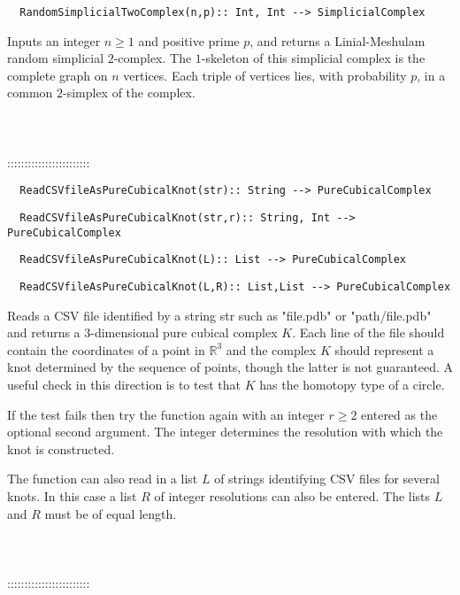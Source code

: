 \documentclass[a4paper,11pt]{report}
\begin{document}
{\begin{verbatim}  RandomSimplicialTwoComplex(n,p):: Int, Int --> SimplicialComplex
\end{verbatim}


 

 Inputs an integer $ n \ge 1 $ and positive prime $p$, and returns a Linial-Meshulam random simplicial $2$-complex. The $1$-skeleton of this simplicial complex is the complete graph on $n$ vertices. Each triple of vertices lies, with probability $p$, in a common $2$-simplex of the complex. \\
 \\
 \\
 \\
 ::::::::::::::::::::::::\\
 
\begin{verbatim}  ReadCSVfileAsPureCubicalKnot(str):: String --> PureCubicalComplex
\end{verbatim}
 
\begin{verbatim}  ReadCSVfileAsPureCubicalKnot(str,r):: String, Int --> PureCubicalComplex
\end{verbatim}
 
\begin{verbatim}  ReadCSVfileAsPureCubicalKnot(L):: List --> PureCubicalComplex
\end{verbatim}
 
\begin{verbatim}  ReadCSVfileAsPureCubicalKnot(L,R):: List,List --> PureCubicalComplex
\end{verbatim}


 

 Reads a CSV file identified by a string str such as "file.pdb" or
"path/file.pdb" and returns a $3$-dimensional pure cubical complex $K$. Each line of the file should contain the coordinates of a point in $\mathbb R^3$ and the complex $K$ should represent a knot determined by the sequence of points, though the
latter is not guaranteed. A useful check in this direction is to test that $K$ has the homotopy type of a circle. 

If the test fails then try the function again with an integer $r \ge 2$ entered as the optional second argument. The integer determines the resolution
with which the knot is constructed. 

 The function can also read in a list $L$ of strings identifying CSV files for several knots. In this case a list $R$ of integer resolutions can also be entered. The lists $L$ and $R$ must be of equal length. \\
 \\
 \\
 \\
 ::::::::::::::::::::::::\\
 
}
\end{document}
